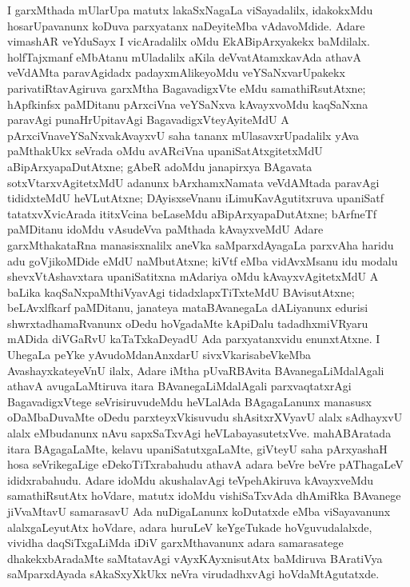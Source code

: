 I garxMthada mUlarUpa matutx lakaSxNagaLa viSayadalilx, idakokxMdu hosa\-rUpa\-vanunx koDuva parxyatanx naDeyiteMba vAdavoMdide. Adare vimashAR veYduSayx I vicAradalilx oMdu EkABipArxyakekx baMdilalx. holfTajxmanf  eMbA\-tanu mUladalilx aKila deVvatAtamxkavAda athavA veVdAMta paravAgidadx padayx\-mAlike\-yoMdu veYSaNxvarUpakekx parivatiRtavAgiruva garxMtha BagavadigxVte eMdu samathiRsu\-tAtxne; hApfkinfsx paMDitanu pArxciVna veYSaNxva kAvayxvoMdu kaqSaNxna paravAgi punaHrUpita\-vAgi BagavadigxVteyAyiteMdU A pArxciVnaveYSaNxvakAvayxvU saha tananx mUlasavxrUpa\-dalilx yAva paMthakUkx seVrada oMdu avARciVna upaniSatAtxgitetxMdU aBipArxya\-paDutAtxne; gAbeR  adoMdu janapirxya BAgavata sotxVtarxvAgitetxMdU \hbox{adanunx} bArxhamxNamata veVdAMtada paravAgi tididxteMdU heVLutAtxne; DAyisxseVnanu  iLimuKavAgutitxruva upaniSatf tatatxvXvicArada ititxVcina beLaseMdu aBipArxyapaDutAtxne; bArfneTf  paMDitanu idoMdu vAsudeVva paMthada kAvayxveMdU Adare garxMthakataRna manasisxnalilx aneVka saMparxdAyagaLa parxvAha haridu adu goVjikoMDide eMdU naMbutAtxne; kiVtf  eMba vidAvxMsanu idu modalu shevxVtAshavxtara upaniSatitxna mAdariya oMdu kAvayxvAgitetxMdU A baLika kaqSaNxpaMthiVyavAgi tidadxlapxTiTxteMdU BAvisutAtxne; beLAvxlfkarf paMDitanu, janateya mataBAvanegaLa dALiyanunx edurisi shwrxtadhamaRvanunx oDedu hoVgadaMte kApiDalu tadadhxmiVRyaru mADida diVGaRvU kaTaTxkaDeyadU Ada parxyatanxvidu enunxtAtxne. I UhegaLa peYke yAvudoMdanAnxdarU sivxVkarisabeVkeMba AvashayxkateyeVnU ilalx, Adare iMtha pUvaRBAvita BAvanegaLiMdalAgali athavA avugaLaMtiruva itara BAvanegaLiMdalAgali parxvaqtatxrAgi BagavadigxVtege seVrisiruvudeMdu heVLalAda BAga\-gaLanunx manasusx oDaMbaDuvaMte oDedu parxteyxVkisuvudu shAsitxrXVyavU alalx sAdhayxvU alalx eMbudanunx nAvu sapxSaTxvAgi heVLabayasutetxVve. mahABAratada itara BAga\-gaLaMte, kelavu upaniSatutxgaLaMte, giVteyU saha pArxyashaH hosa seVrikegaLige eDekoTiTxra\-bahudu athavA adara beVre beVre pAThagaLeV ididxrabahudu. Adare idoMdu akushala\-vAgi teVpehAkiruva kAvayxveMdu samathiRsutAtx hoVdare, matutx idoMdu vishiSaTx\-vAda dhAmiRka BAvanege jiVvaMtavU samarasavU Ada nuDigaLanunx koDutatxde eMba viSayavanunx alalxgaLeyutAtx hoVdare, adara huruLeV keYgeTukade hoVguvudalalxde, vividha daqSiTxgaLiMda iDiV garxMthavanunx adara samarasatege dhakekxbAradaMte saMtata\-vAgi vAyxKAyxnisutAtx baMdiruva BAratiVya saMparxdAyada sAkaSxyXkUkx neVra virudadhxvAgi hoVdaMtAgutatxde.

